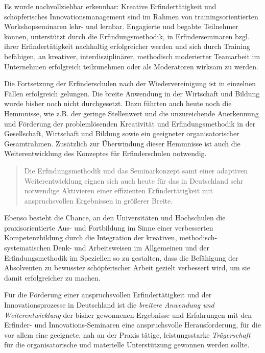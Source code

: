 \documentclass[11pt,a4paper]{article}
\begin{document}
Es wurde nachvollziehbar erkennbar: Kreative Erfindertätigkeit und
schöpferisches Innovationsmanagement sind im Rahmen von trainingsorientierten
Workshopseminaren lehr- und lernbar. Engagierte und begabte Teilnehmer können,
unterstützt durch die Erfindungsmethodik, in Erfinderseminaren bzgl. ihrer
Erfindertätigkeit nachhaltig erfolgreicher werden und sich durch Training
befähigen, an kreativer, interdisziplinärer, methodisch moderierter Teamarbeit
im Unternehmen erfolgreich teilzunehmen oder als Moderatoren wirksam zu
werden.

Die Fortsetzung der Erfinderschulen nach der Wiedervereinigung ist in
einzelnen Fällen erfolgreich gelungen. Die breite Anwendung in der Wirtschaft
und Bildung wurde bisher noch nicht durchgesetzt. Dazu führten auch heute noch
die Hemmnisse, wie z.B. der geringe Stellenwert und die unzureichende
Anerkennung und Förderung der problemlösenden Kreativität und
Erfindungsmethodik in der Gesellschaft, Wirtschaft und Bildung sowie ein
geeigneter organisatorischer Gesamtrahmen. Zusätzlich zur Überwindung dieser
Hemmnisse ist auch die Weiterentwicklung des Konzeptes für Erfinderschulen
notwendig.

\begin{quote}
  Die Erfindungsmethodik und das Seminarkonzept samt einer adaptiven
  Weiterentwicklung eignen sich auch heute für das in Deutschland sehr
  notwendige Aktivieren einer effizienten Erfindertätigkeit mit
  anspruchsvollen Ergebnissen in größerer Breite.
\end{quote}

Ebenso besteht die Chance, an den Universitäten und Hochschulen die
praxisorientierte Aus- und Fortbildung im Sinne einer verbesserten
Kompetenzbildung durch die Integration der kreativen,
methodisch-systematischen Denk- und Arbeitsweisen im Allgemeinen und der
Erfindungsmethodik im Speziellen so zu gestalten, dass die Befähigung der
Absolventen zu bewusster schöpferischer Arbeit gezielt verbessert wird, um sie
damit erfolgreicher zu machen.

Für die Förderung einer anspruchsvollen Erfindertätigkeit und der
Innovationsprozesse in Deutschland ist die \emph{breitere Anwendung und
Weiterentwicklung} der bisher gewonnenen Ergebnisse und Erfahrungen mit den
Erfinder- und Innovations-Seminaren eine anspruchsvolle Herausforderung, für
die vor allem eine geeignete, nah an der Praxis tätige, leistungsstarke
\emph{Trägerschaft} für die organisatorische und materielle Unterstützung
gewonnen werden sollte.
\end{document}
